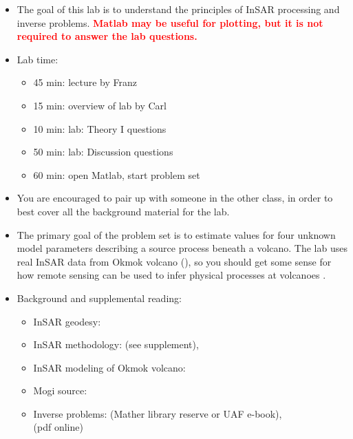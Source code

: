 \documentclass[11pt,titlepage,fleqn]{article}
\begin{document}
\begin{itemize}
\item The goal of this lab is to understand the principles of InSAR processing and inverse problems. 
\textcolor{red}{\bf Matlab may be useful for plotting, but it is not required to answer the lab questions.}

\item Lab time:
%
\begin{itemize}
\item 45 min: lecture by Franz
\item 15 min: overview of lab by Carl
\item 10 min: lab: Theory I questions
\item 50 min: lab: Discussion questions
\item 60 min: open Matlab, start problem set
\end{itemize}

\item You are encouraged to pair up with someone in the other class, in order to best cover all the background material for the lab.

\item The primary goal of the problem set is to estimate values for four unknown model parameters describing a source process beneath a volcano. The lab uses real InSAR data from Okmok volcano (), so you should get some sense for how remote sensing can be used to infer physical processes at volcanoes \citep[\eg][]{ZLu2005}.

\item Background and supplemental reading:
%
\begin{itemize}
\item InSAR geodesy: \citet{Rosen2000,SimonsRosen2007}

\item InSAR methodology: \citet{Wright2003} (see supplement), \citet{ZLu2007}

\item InSAR modeling of Okmok volcano: \citet{ZLu2005}

\item Mogi source: \citet{Mogi1958}

\item Inverse problems: \citet{Aster} (Mather library reserve or UAF e-book), \\
\citet{Tarantola2005} (pdf online)

\end{itemize}

\end{itemize}
\end{document}
